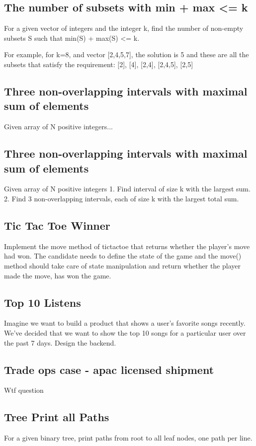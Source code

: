 \documentclass{llncs}
\begin{document}
\subsection{The number of subsets with min + max <= k}
For a given vector of integers and the integer k, find the number of non-empty subsets S such that min(S) + max(S) <= k.

For example, for k=8, and vector [2,4,5,7], the solution is 5 and these are all the subsets that satisfy the requirement: [2], [4], [2,4], [2,4,5], [2,5]

\subsection{Three non-overlapping intervals with maximal sum of elements}
Given array of N positive integers...

\subsection{Three non-overlapping intervals with maximal sum of elements}
Given array of N positive integers
1. Find interval of size k with the largest sum.
2. Find 3 non-overlapping intervals, each of size k with the largest total sum.

\subsection{Tic Tac Toe Winner}
Implement the move method of tictactoe that returns whether the player's move had won. The candidate needs to define the state of the game and the move() method should take care of state manipulation and return whether the player made the move, has won the game.

\subsection{Top 10 Listens}
Imagine we want to build a product that shows a user's favorite songs recently. We've decided that we want to show the top 10 songs for a particular user over the past 7 days. Design the backend.

\subsection{Trade ops case - apac licensed shipment}
Wtf question

\subsection{Tree Print all Paths}
For a given binary tree, print paths from root to all leaf nodes, one path per line.
\end{document}
